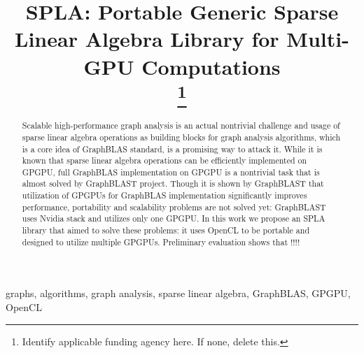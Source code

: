 \documentclass[conference]{IEEEtran}
\begin{document}
\title{SPLA: Portable Generic Sparse Linear Algebra Library for Multi-GPU Computations\\
\thanks{Identify applicable funding agency here. If none, delete this.}
}

\author{
\and
{}
\and
{}
}

\maketitle

\begin{abstract}
    Scalable high-performance graph analysis is an actual nontrivial challenge and usage of sparse linear algebra operations as building blocks for graph analysis algorithms, which is a core idea of GraphBLAS standard, is a promising way to attack it.
    While it is known that sparse linear algebra operations can be efficiently implemented on GPGPU, full GraphBLAS implementation on GPGPU is a nontrivial task that is almost solved by GraphBLAST project. Though it is shown by GraphBLAST that utilization of GPGPUs for GraphBLAS implementation significantly improves performance, portability and scalability problems are not solved yet: GraphBLAST uses Nvidia stack and utilizes only one GPGPU.
    In this work we propose an SPLA library that aimed to solve these problems: it uses OpenCL to be portable and designed to utilize multiple GPGPUs.
    Preliminary evaluation shows that !!!!
\end{abstract}

\begin{IEEEkeywords}
graphs, algorithms, graph analysis, sparse linear algebra, GraphBLAS, GPGPU, OpenCL
\end{IEEEkeywords}









\end{document}
